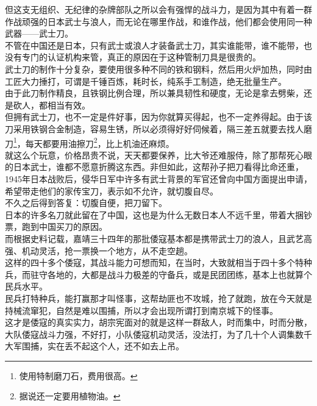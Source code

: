 \begin{multicols}{\theparacolNo}
但这支无组织、无纪律的杂牌部队之所以会有强悍的战斗力，是因为其中有着一群作战顽强的日本武士与浪人，而无论在哪里作战，和谁作战，他们都会使用同一种武器——武士刀。\\

不管在中国还是日本，只有武士或浪人才装备武士刀，其实谁能带，谁不能带，也没有专门的认证机构来管，真正的原因在于这种管制刀具是很贵的。\\

武士刀的制作十分复杂，要使用很多种不同的铁和钢料，然后用火炉加热，同时由工匠大力捶打，可谓是千锤百炼，耗时长，纯系手工制造，绝无批量生产。\\

由于此刀制作精良，且铁钢比例合理，所以兼具韧性和硬度，无论是拿去劈柴，还是砍人，都相当有效。\\

但拥有武士刀，也不一定是件好事，因为你就算买得起，也不一定养得起。由于该刀采用铁钢合金制造，容易生锈，所以必须得好好伺候着，隔三差五就要去找人磨刀\footnote{使用特制磨刀石，费用很高。}，每天都要用油擦刀\footnote{据说还一定要用植物油。}，比上机油还麻烦。\\

就这么个玩意，价格昂贵不说，天天都要保养，比大爷还难服侍，除了那帮死心眼的日本武士，谁都不愿意折腾这东西。非但如此，这帮孙子把刀看得比命还重，1945年日本战败后，侵华日军中许多有武士背景的军官还曾向中国方面提出申请，希望带走他们的家传宝刀，表示如不允许，就切腹自尽。\\

不久之后得到答复：切腹自便，把刀留下。\\

日本的许多名刀就此留在了中国，这也是为什么无数日本人不远千里，带着大捆钞票，跑到中国买刀的原因。\\

而根据史料记载，嘉靖三十四年的那批倭寇基本都是携带武士刀的浪人，且武艺高强、机动灵活，抢一票换一个地方，从不走空趟。\\

这样的四十多个倭寇，其战斗能力可想而知，在当时，大致就相当于四十多个特种兵，而驻守各地的，大都是战斗力极差的守备兵，或是民团团练，基本上也就算个民兵水平。\\

民兵打特种兵，能打赢那才叫怪事，这帮劫匪也不攻城，抢了就跑，放在今天就是持械流窜犯，自然是难以围捕，所以才会出现所谓打到南京城下的怪事。\\

这才是倭寇的真实实力，胡宗宪面对的就是这样一群敌人，时而集中，时而分散，大队倭寇战斗力强，不好打，小队倭寇机动灵活，没法打，为了几十个人调集数千大军围捕，实在丢不起这个人，还不如去上吊。\\


\end{multicols}
